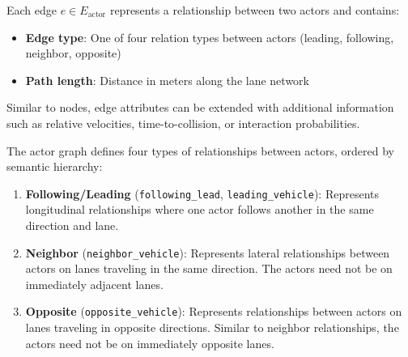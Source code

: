 Each edge $e \in E_{\text{actor}}$ represents a relationship between two actors and contains:

\begin{itemize}
    \item \textbf{Edge type}: One of four relation types between actors (leading, following, neighbor, opposite)
    \item \textbf{Path length}: Distance in meters along the lane network 
\end{itemize}

Similar to nodes, edge attributes can be extended with additional information such as relative 
velocities, time-to-collision, or interaction probabilities.

\label{subsubsec:relation_types}

The actor graph defines four types of relationships between actors, ordered by semantic hierarchy:

\begin{enumerate}
    \item \textbf{Following/Leading} (\texttt{following\_lead}, \texttt{leading\_vehicle}): 
          Represents longitudinal relationships where one actor follows another in the same 
          direction and lane.  
    
    \item \textbf{Neighbor} (\texttt{neighbor\_vehicle}): Represents lateral relationships 
          between actors on lanes traveling in the same direction. The actors need not be on 
          immediately adjacent lanes.
    
    \item \textbf{Opposite} (\texttt{opposite\_vehicle}): Represents relationships between actors 
          on lanes traveling in opposite directions. Similar to neighbor relationships, the actors 
          need not be on immediately opposite lanes.
\end{enumerate}

